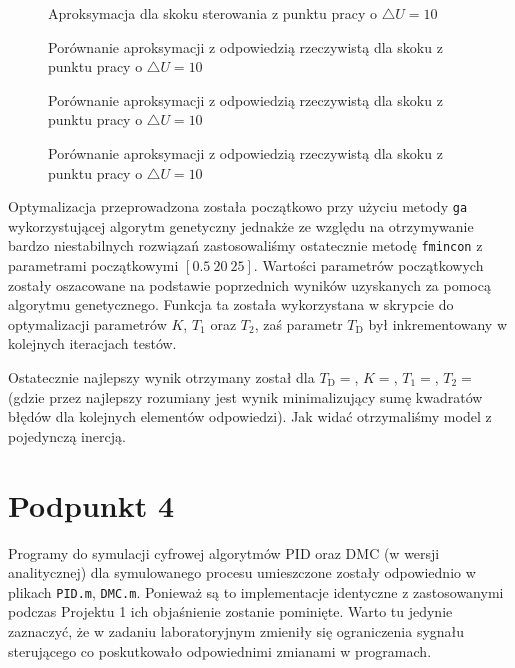 \begin{figure}[ht]
\centering

\caption{Aproksymacja dla skoku sterowania z punktu pracy o $\triangle U = 10$}
\label{R3}
\end{figure}

\begin{figure}[ht]
\centering

\caption{Porównanie aproksymacji z odpowiedzią rzeczywistą dla skoku z punktu pracy o $\triangle U = 10$}
\label{R4}
\end{figure}

\begin{figure}[ht]
\centering

\caption{Porównanie aproksymacji z odpowiedzią rzeczywistą dla skoku z punktu pracy o $\triangle U = 10$}
\label{R5}
\end{figure}

\begin{figure}[ht]
\centering

\caption{Porównanie aproksymacji z odpowiedzią rzeczywistą dla skoku z punktu pracy o $\triangle U = 10$}
\label{R6}
\end{figure}

Optymalizacja przeprowadzona została początkowo przy użyciu metody \verb+ga+ wykorzystującej algorytm genetyczny jednakże ze względu na otrzymywanie bardzo niestabilnych rozwiązań zastosowaliśmy ostatecznie metodę \verb+fmincon+ z parametrami początkowymi $[\num{0,5} ~ 20 ~ 25]$. Wartości parametrów początkowych zostały oszacowane na podstawie poprzednich wyników uzyskanych za pomocą algorytmu genetycznego. Funkcja ta została wykorzystana w skrypcie do optymalizacji parametrów $K$, $T_1$ oraz $T_2$, zaś parametr $T_{\mathrm{D}}$ był inkrementowany w kolejnych iteracjach testów.

Ostatecznie najlepszy wynik otrzymany został dla $T_{\mathrm{D}}=$, $K=\num{}$, $T_1=\num{}$, $T_2=\num{}$ (gdzie przez najlepszy rozumiany jest wynik minimalizujący sumę kwadratów błędów dla kolejnych elementów odpowiedzi). Jak widać otrzymaliśmy model z pojedynczą inercją.

\chapter{Podpunkt 4}
Programy do symulacji cyfrowej algorytmów PID oraz DMC (w wersji analitycznej) dla symulowanego procesu umieszczone zostały odpowiednio w plikach \verb+PID.m+, \verb+DMC.m+. Ponieważ są to implementacje identyczne z zastosowanymi podczas Projektu 1 ich objaśnienie zostanie pominięte. Warto tu jedynie zaznaczyć, że w zadaniu laboratoryjnym zmieniły się ograniczenia sygnału sterującego co poskutkowało odpowiednimi zmianami w programach.

